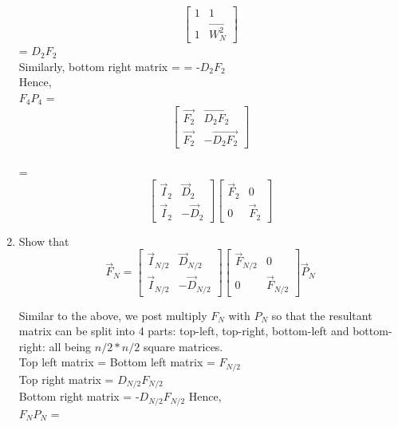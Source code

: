 \documentclass[journal,12pt,twocolumn]{IEEEtran}
\renewcommand\thesection{\arabic{section}}
\begin{document}
\begin{enumerate}[label=\arabic*.,ref=\thesection.\theenumi]
\begin{solution}
\begin{equation}
	\begin{bmatrix}
		1 & 1 \\
		1 & \vec{W_{N}^{2}}
	\end{bmatrix}
\end{equation}
= ${D_{2}}{F_{2}}$
\\
Similarly, bottom right matrix = 
= -${D_{2}}{F_{2}}$
\\
Hence,
\\${F_{4}{P_{4}}}$ = 
\begin{equation}
	\begin{bmatrix}
		\vec{F_{2}} & \vec{D_{2}F_{2}} \\
		\vec{F_{2}} & -\vec{D_{2}F_{2}}
	\end{bmatrix}
\end{equation}
\\=
\begin{equation}
\begin{bmatrix}
	\vec{I}_{2} & \vec{D}_{2} \\
\vec{I}_{2} & -\vec{D}_{2}
\end{bmatrix}
\begin{bmatrix}
\vec{F}_{2} & 0 \\
0 & \vec{F}_{2}
\end{bmatrix}
\end{equation}
\end{solution}
\item Show that 
\begin{equation}
\vec{F}_{N}=
\begin{bmatrix}
\vec{I}_{N/2} & \vec{D}_{N/2} \\
\vec{I}_{N/2} & -\vec{D}_{N/2}
\end{bmatrix}
\begin{bmatrix}
\vec{F}_{N/2} & 0 \\
0 & \vec{F}_{N/2}
\end{bmatrix}
\vec{P}_{N}
\end{equation}
\begin{solution}
	Similar to the above, we post multiply $F_{N}$ with $P_{N}$
	so that the resultant matrix can be split into 4 parts:
	top-left, top-right, bottom-left and bottom-right: all being 
	${n/2}*{n/2}$ square matrices.
	\\
	Top left matrix = Bottom left matrix = $F_{N/2}$
	\\
	Top right matrix = $D_{N/2}$$F_{N/2}$
	\\
	Bottom right matrix = -$D_{N/2}$$F_{N/2}$
	Hence,
\\${F_{N}{P_{N}}}$ = 

\end{solution}
\end{enumerate}
\end{document}
